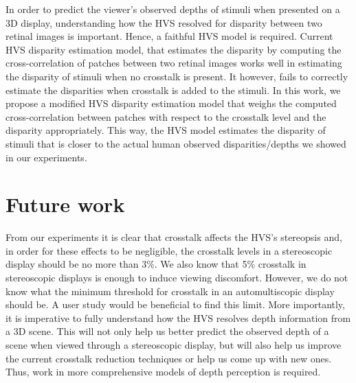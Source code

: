 In order to predict the viewer's observed depths of stimuli when presented on a 3D display, understanding how the HVS resolved for disparity between two retinal images is important. Hence, a faithful HVS model is required. Current HVS disparity estimation model, that estimates the disparity by computing the cross-correlation of patches between two retinal images works well in estimating the disparity of stimuli when no crosstalk is present. It however, fails to correctly estimate the disparities when crosstalk is added to the stimuli. In this work, we propose a modified HVS disparity estimation model that weighs the computed cross-correlation between patches with respect to the crosstalk level and the disparity appropriately. This way, the HVS model estimates the disparity of stimuli that is closer to the actual human observed disparities/depths we showed in our experiments.

\section{Future work}

From our experiments it is clear that crosstalk affects the HVS's stereopsis and, in order for these effects to be negligible, the crosstalk levels in a stereoscopic display should be no more than 3\%. We also know that 5\% crosstalk in stereoscopic displays is enough to induce viewing discomfort. However, we do not know what the minimum threshold for crosstalk in an automultiscopic display should be. A user study would be beneficial to find this limit. More importantly, it is imperative to fully understand how the HVS resolves depth information from a 3D scene. This will not only help us better predict the observed depth of a scene when viewed through a stereoscopic display, but will also help us improve the current crosstalk reduction techniques or help us come up with new ones. Thus, work in more comprehensive models of depth perception is required.

